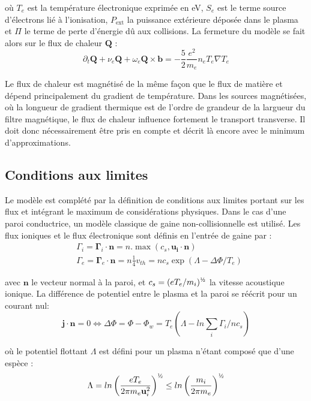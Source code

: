 où $T_e$ est la température électronique exprimée en eV, $S_e$ est le
terme source d'électrons lié à l'ionisation, $P_\text{ext}$ la puissance
extérieure déposée dans le plasma et $\Pi$ le terme de perte d'énergie dû aux collisions. La fermeture du modèle se fait alors sur le flux de chaleur
$\mathbf{Q}$ \cite{Golant} :
\begin{equation}
\label{3-energie}
\partial_t \mathbf{Q} + \nu_e\mathbf{Q}+\omega_e\mathbf{Q}\times\mathbf{b} =
-\frac{5}{2}\frac{e^2}{m_e}n_eT_e\nabla T_e
\end{equation}

Le flux de chaleur est magnétisé de la même façon que le flux de matière et
dépend principalement du gradient de température. Dans les sources magnétisées,
où la longueur de gradient thermique est de l'ordre de grandeur de la largueur
du filtre magnétique, le flux de chaleur influence fortement le transport
transverse. Il doit donc nécessairement être pris en compte et décrit là encore
avec le minimum d'approximations.

\subsection{Conditions aux limites}
Le modèle est complété par la définition de conditions aux limites
portant sur les flux et intégrant le maximum de considérations physiques. Dans
le cas d'une paroi conductrice, un modèle classique de gaine non-collisionnelle
est utilisé. Les flux ioniques et le flux électronique sont définis en
l'entrée de gaine par :
\begin{align}
&\Gamma_i=\boldsymbol{\Gamma}_i\cdot\mathbf{n}=n.\max\left(c_s,\mathbf{u_i}\cdot\mathbf{n}\right)
\\
&\Gamma_e=\boldsymbol{\Gamma}_e\cdot\mathbf{n}=n\frac{1}{4}v_{th}=nc_s\exp(\Lambda-\Delta
\Phi/T_e)
\end{align}

avec $\mathbf{n}$ le vecteur normal à la paroi,
et $c_s=(eT_e/m_i)^{\text{\textonehalf}}$ la vitesse acoustique ionique.
La différence de potentiel entre le plasma et la
paroi se réécrit pour un courant nul:
\begin{equation}
	\mathbf{j}\cdot\mathbf{n}=0\Leftrightarrow \Delta \Phi=\Phi-\Phi_w =
T_e(\Lambda-ln\sum_i\Gamma_i/nc_s)
\end{equation} 

où le potentiel flottant $\Lambda$ est défini pour un plasma
n'étant composé que d'une espèce :
\begin{equation}
	\Lambda=ln\left(\frac{eT_e}{2\pi
	m_e\mathbf{u}_i^2}\right)^{\text{\textonehalf}} \le 
	ln\left(\frac{m_i}{2\pi m_e}\right)^{\text{\textonehalf}}
\end{equation}

